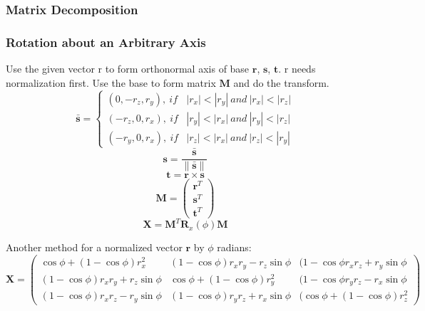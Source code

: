 \documentclass[10pt, a4paper]{article}
\begin{document}
            \subsubsection{Matrix Decomposition}
                \newpage
            \subsubsection{Rotation about an Arbitrary Axis} 
                Use the given vector $\text{r}$ to form orthonormal axis of base $\textbf{r}$, $\textbf{s}$, $\textbf{t}$. $\text{r}$ needs normalization first. Use the base to form matrix $\textbf{M}$ and do the transform.
                \begin{equation*} \bar{\textbf{s}} = 
                    \left\{
                    \begin{array}{lr}
                        (0, -r_z, r_y),\ if & |r_x| < |r_y|\  and\ |r_x| < |r_z| \\
                        (-r_z, 0, r_x),\ if & |r_y| < |r_x|\  and\ |r_y| < |r_z| \\
                        (-r_y, 0, r_x),\ if & |r_z| < |r_x|\  and\ |r_z| < |r_y| 
                    \end{array}
                    \right.
                \end{equation*} 
                $$\textbf{s} = \frac{\bar{\textbf{s}}}{\parallel{\bar{\textbf{s}}}\parallel} $$
                $$\textbf{t} = \textbf{r}\times\textbf{s}$$
                \begin{equation*}
                    \textbf{M} = 
                    \begin{pmatrix}
                        \textbf{r}^T \\
                        \textbf{s}^T \\
                        \textbf{t}^T
                    \end{pmatrix} 
                \end{equation*} 
                $$\textbf{X} = \textbf{M}^T\textbf{R}_{x}(\phi)\textbf{M}$$
                
                Another method for a normalized vector $\textbf{r}$ by $\phi$ radians: 
                \begin{equation*}
                    \textbf{X} = 
                    \begin{pmatrix}
                        \cos{\phi} + (1 - \cos{\phi})r_x^2 & (1 - \cos{\phi})r_xr_y - r_z\sin{\phi} & (1 - \cos{\phi}r_xr_z + r_y\sin{\phi} \\
                        (1 - \cos{\phi})r_xr_y + r_z\sin{\phi} & \cos{\phi} + (1 - \cos{\phi})r_y^2 & (1 - \cos{\phi}r_yr_z - r_x\sin{\phi} \\
                        (1 - \cos{\phi})r_xr_z - r_y\sin{\phi} & (1 - \cos{\phi})r_yr_z + r_x\sin{\phi} & (\cos{\phi} + (1 - \cos{\phi})r_z^2
                    \end{pmatrix}
                \end{equation*} 
                \newpage
        
\end{document}
